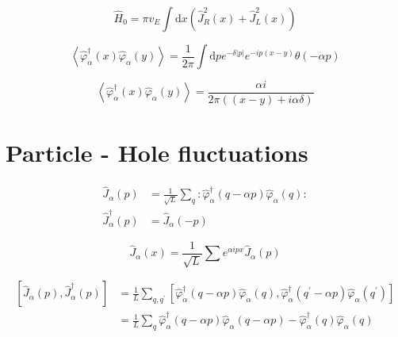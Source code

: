\begin{equation*}
\hat{H}_{0}=\pi v_{E} \int \mathrm{d} x\left(\hat{J}_{R}^{2}(x)+\hat{J}_{L}^{2}(x)\right) \tag{2.24}
\end{equation*}


\begin{equation*}
\left\langle\hat{\varphi}_{\alpha}^{\dagger}(x) \hat{\varphi}_{\alpha}(y)\right\rangle=\frac{1}{2 \pi} \int \mathrm{d} p e^{-\delta|p|} e^{-i p(x-y)} \theta(-\alpha p) \tag{2.25}
\end{equation*}


\begin{equation*}
\left\langle\hat{\varphi}_{\alpha}^{\dagger}(x) \hat{\varphi}_{\alpha}(y)\right\rangle=\frac{\alpha i}{2 \pi((x-y)+i \alpha \delta)} \tag{2.26}
\end{equation*}





\section{Particle - Hole fluctuations}


\begin{align*}
\hat{J}_{\alpha}(p) & =\frac{1}{\sqrt{L}} \sum_{q}: \hat{\varphi}_{\alpha}^{\dagger}(q-\alpha p) \hat{\varphi}_{\alpha}(q):  \tag{2.27}\\
\hat{J}_{\alpha}^{\dagger}(p) & =\hat{J}_{\alpha}(-p)
\end{align*}



\begin{equation*}
\hat{J}_{\alpha}(x)=\frac{1}{\sqrt{L}} \sum e^{\alpha i p x} \hat{J}_{\alpha}(p) \tag{2.28}
\end{equation*}


\begin{align*}
{\left[\hat{J}_{\alpha}(p), \hat{J}_{\alpha}^{\dagger}(p)\right] } & =\frac{1}{L} \sum_{q, q^{\prime}}\left[\hat{\varphi}_{\alpha}^{\dagger}(q-\alpha p) \hat{\varphi}_{\alpha}(q), \hat{\varphi}_{\alpha}^{\dagger}\left(q^{\prime}-\alpha p\right) \hat{\varphi}_{\alpha}\left(q^{\prime}\right)\right]  \tag{2.29}\\
& =\frac{1}{L} \sum_{q} \hat{\varphi}_{\alpha}^{\dagger}(q-\alpha p) \hat{\varphi}_{\alpha}(q-\alpha p)-\hat{\varphi}_{\alpha}^{\dagger}(q) \hat{\varphi}_{\alpha}(q)
\end{align*}



